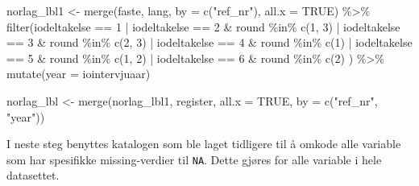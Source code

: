 \documentclass[
  norsk,
  letterpaper,
  DIV=11,
  numbers=noendperiod]{scrreprt}
\newenvironment{Shaded}{\begin{snugshade}}{\end{snugshade}}
\newcommand{\AttributeTok}[1]{\textcolor[rgb]{0.40,0.45,0.13}{#1}}
\newcommand{\ConstantTok}[1]{\textcolor[rgb]{0.56,0.35,0.01}{#1}}
\newcommand{\DecValTok}[1]{\textcolor[rgb]{0.68,0.00,0.00}{#1}}
\newcommand{\FunctionTok}[1]{\textcolor[rgb]{0.28,0.35,0.67}{#1}}
\newcommand{\NormalTok}[1]{\textcolor[rgb]{0.00,0.23,0.31}{#1}}
\newcommand{\OtherTok}[1]{\textcolor[rgb]{0.00,0.23,0.31}{#1}}
\newcommand{\SpecialCharTok}[1]{\textcolor[rgb]{0.37,0.37,0.37}{#1}}
\newcommand{\StringTok}[1]{\textcolor[rgb]{0.13,0.47,0.30}{#1}}
\theoremstyle{definition}
\theoremstyle{remark}
\begin{document}
\begin{Shaded}
\begin{Highlighting}[]
\NormalTok{norlag\_lbl1 }\OtherTok{\textless{}{-}} \FunctionTok{merge}\NormalTok{(faste, lang, }\AttributeTok{by =} \FunctionTok{c}\NormalTok{(}\StringTok{"ref\_nr"}\NormalTok{), }\AttributeTok{all.x =} \ConstantTok{TRUE}\NormalTok{) }\SpecialCharTok{\%\textgreater{}\%} 
  \FunctionTok{filter}\NormalTok{(iodeltakelse }\SpecialCharTok{==} \DecValTok{1} \SpecialCharTok{|}  
\NormalTok{           iodeltakelse }\SpecialCharTok{==} \DecValTok{2} \SpecialCharTok{\&}\NormalTok{ round }\SpecialCharTok{\%in\%} \FunctionTok{c}\NormalTok{(}\DecValTok{1}\NormalTok{, }\DecValTok{3}\NormalTok{) }\SpecialCharTok{|} 
\NormalTok{           iodeltakelse }\SpecialCharTok{==} \DecValTok{3} \SpecialCharTok{\&}\NormalTok{ round }\SpecialCharTok{\%in\%} \FunctionTok{c}\NormalTok{(}\DecValTok{2}\NormalTok{, }\DecValTok{3}\NormalTok{) }\SpecialCharTok{|}
\NormalTok{           iodeltakelse }\SpecialCharTok{==} \DecValTok{4} \SpecialCharTok{\&}\NormalTok{ round }\SpecialCharTok{\%in\%} \FunctionTok{c}\NormalTok{(}\DecValTok{1}\NormalTok{) }\SpecialCharTok{|}
\NormalTok{           iodeltakelse }\SpecialCharTok{==} \DecValTok{5} \SpecialCharTok{\&}\NormalTok{ round }\SpecialCharTok{\%in\%} \FunctionTok{c}\NormalTok{(}\DecValTok{1}\NormalTok{, }\DecValTok{2}\NormalTok{) }\SpecialCharTok{|}
\NormalTok{           iodeltakelse }\SpecialCharTok{==} \DecValTok{6} \SpecialCharTok{\&}\NormalTok{ round }\SpecialCharTok{\%in\%} \FunctionTok{c}\NormalTok{(}\DecValTok{2}\NormalTok{)}
\NormalTok{  ) }\SpecialCharTok{\%\textgreater{}\%} 
  \FunctionTok{mutate}\NormalTok{(}\AttributeTok{year =}\NormalTok{ iointervjuaar)}

\NormalTok{norlag\_lbl }\OtherTok{\textless{}{-}} \FunctionTok{merge}\NormalTok{(norlag\_lbl1, register, }\AttributeTok{all.x =} \ConstantTok{TRUE}\NormalTok{, }\AttributeTok{by =} \FunctionTok{c}\NormalTok{(}\StringTok{"ref\_nr"}\NormalTok{, }\StringTok{"year"}\NormalTok{))}
\end{Highlighting}
\end{Shaded}

I neste steg benyttes katalogen som ble laget tidligere til å omkode
alle variable som har spesifikke missing-verdier til \texttt{NA}. Dette
gjøres for alle variable i hele datasettet.
\end{document}
